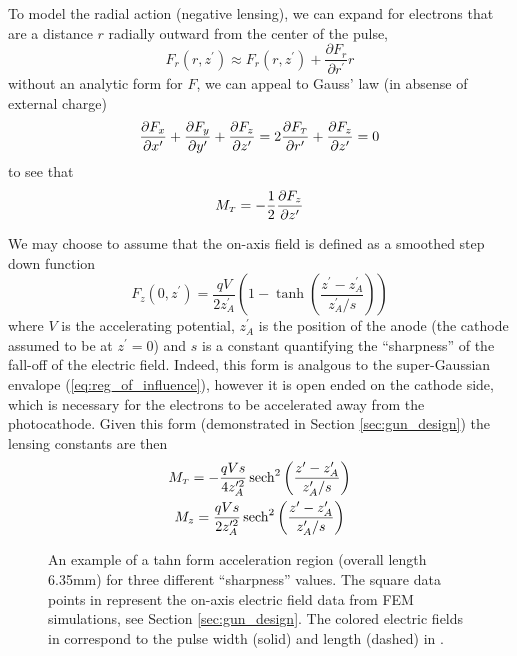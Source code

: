 To model the radial action (negative lensing), we can expand for electrons that are a distance $r$ radially outward from the center of the pulse,
\begin{equation}
  F_r(r,z^{\prime}) \approx F_r(r,z^{\prime}) + \frac{\partial F_r}{\partial r^{\prime}} r
\end{equation}
without an analytic form for $F$, we can appeal to Gauss' law (in absense of external charge)
\begin{equation}
  \frac{\partial F_x}{\partial x^{\prime}} + \frac{\partial F_y}{\partial y^{\prime}} + \frac{\partial F_z}{\partial z^{\prime}} = 2 \frac{\partial F_{{\scriptscriptstyle T}}}{\partial r^{\prime}} + \frac{\partial F_z}{\partial z^{\prime}} = 0
\end{equation}
to see that
\begin{equation}
  M_{{\scriptscriptstyle T}} = -\frac{1}{2}\frac{\partial F_z}{\partial z^{\prime}}
\end{equation}

We may choose to assume that the on-axis field is defined as a smoothed step down function
\begin{equation}
  F_z(0,z^{\prime}) = \frac{qV}{2z^{\prime}_A} \left( 1 - \tanh \left( \frac{ z^{\prime} - z^{\prime}_A }{ z^{\prime}_A / s } \right) \right)
\end{equation}
where $V$ is the accelerating potential, $z^{\prime}_A$ is the position of the anode (the cathode assumed to be at $z^{\prime} = 0$) and $s$ is a constant quantifying the ``sharpness'' of the fall-off of the electric field.
Indeed, this form is analgous to the super-Gaussian envalope (\ref{eq:reg_of_influence}), however it is open ended on the cathode side, which is necessary for the electrons to be accelerated away from the photocathode.
Given this form (demonstrated in Section \ref{sec:gun_design}) the lensing constants are then
\begin{gather}
  M_{{\scriptscriptstyle T}} = -\frac{qVs}{4z^{\prime 2}_A} \operatorname{sech}^2 \left( \frac{z^{\prime} - z^{\prime}_A }{ z^{\prime}_A / s } \right) \\
  M_z = \frac{qVs}{2z^{\prime 2}_A} \operatorname{sech}^2 \left( \frac{z^{\prime} - z^{\prime}_A }{ z^{\prime}_A / s } \right)
\end{gather}

\begin{figure}
  \centerline{
    \subfloat[][]{
      \label{fig:field_on_axis}
      
    }
    \subfloat[][]{
      \label{fig:tanh_sharpness}
      
    }
  }
  \caption{
    An example of a tahn form acceleration region (overall length 6.35mm) for three different ``sharpness'' values.
    The square data points in \protect{} represent the on-axis electric field data from FEM simulations, see Section \ref{sec:gun_design}.
    The colored electric fields in \protect{} correspond to the pulse width (solid) and length (dashed) in \protect{}.
  }
  \label{fig:gun-sharpness}
\end{figure}

